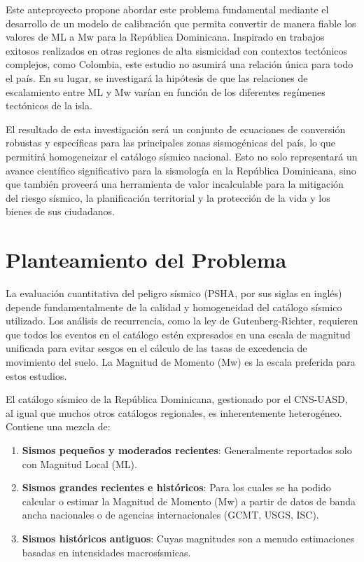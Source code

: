 \documentclass[12pt,a4paper]{article}
\begin{document}
Este anteproyecto propone abordar este problema fundamental mediante el desarrollo de un modelo de calibración que permita convertir de manera fiable los valores de ML a Mw para la República Dominicana. Inspirado en trabajos exitosos realizados en otras regiones de alta sismicidad con contextos tectónicos complejos, como Colombia, este estudio no asumirá una relación única para todo el país. En su lugar, se investigará la hipótesis de que las relaciones de escalamiento entre ML y Mw varían en función de los diferentes regímenes tectónicos de la isla.

El resultado de esta investigación será un conjunto de ecuaciones de conversión robustas y específicas para las principales zonas sismogénicas del país, lo que permitirá homogeneizar el catálogo sísmico nacional. Esto no solo representará un avance científico significativo para la sismología en la República Dominicana, sino que también proveerá una herramienta de valor incalculable para la mitigación del riesgo sísmico, la planificación territorial y la protección de la vida y los bienes de sus ciudadanos.

\section{Planteamiento del Problema}
La evaluación cuantitativa del peligro sísmico (PSHA, por sus siglas en inglés) depende fundamentalmente de la calidad y homogeneidad del catálogo sísmico utilizado. Los análisis de recurrencia, como la ley de Gutenberg-Richter, requieren que todos los eventos en el catálogo estén expresados en una escala de magnitud unificada para evitar sesgos en el cálculo de las tasas de excedencia de movimiento del suelo. La Magnitud de Momento (Mw) es la escala preferida para estos estudios.

El catálogo sísmico de la República Dominicana, gestionado por el CNS-UASD, al igual que muchos otros catálogos regionales, es inherentemente heterogéneo. Contiene una mezcla de:
\begin{enumerate}
    \item \textbf{Sismos pequeños y moderados recientes}: Generalmente reportados solo con Magnitud Local (ML).
    \item \textbf{Sismos grandes recientes e históricos}: Para los cuales se ha podido calcular o estimar la Magnitud de Momento (Mw) a partir de datos de banda ancha nacionales o de agencias internacionales (GCMT, USGS, ISC).
    \item \textbf{Sismos históricos antiguos}: Cuyas magnitudes son a menudo estimaciones basadas en intensidades macrosísmicas.
\end{enumerate}
\end{document}
